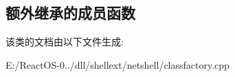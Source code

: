 \subsection*{额外继承的成员函数}


该类的文档由以下文件生成\+:\begin{DoxyCompactItemize}
\item 
E\+:/\+React\+O\+S-\/0../dll/shellext/netshell/classfactory.\+cpp\end{DoxyCompactItemize}
